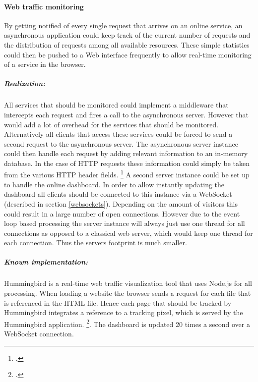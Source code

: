\paragraph{Web traffic monitoring} By getting notified of every single request that
arrives on an online service, an asynchronous application could keep track of the
current number of requests and the distribution of requests among all
available resources. These simple statistics could then be pushed to a Web interface
frequently to allow real-time monitoring of a service in the browser.
\subparagraph{Realization:} All services that should be monitored could implement a
middleware that intercepts each request and fires a call to the asynchronous
server. However that would add a lot of overhead for the services that should
be monitored. Alternatively all clients that access these services could be forced to send a
second request to the asynchronous server.
The asynchronous server instance could then handle each request by adding
relevant information to an in-memory database. In the case of HTTP requests
these information could simply be taken from the various HTTP header fields.
\footcite[Cf.][]{http_rfc}
A second server instance could be set up to handle the online dashboard.
In order to allow instantly updating the dashboard all clients should be
connected to this instance via a WebSocket (described in section \ref{websockets}). Depending on the amount of visitors
this could result in a large number of open connections. However due to the
event loop based processing the server instance will always just use one
thread for all connections as opposed to a classical web server, which would
keep one thread for each connection. Thus the servers footprint is much
smaller.
\subparagraph{Known implementation:} Hummingbird is a real-time web traffic
visualization tool that uses Node.js for all processing. When loading a
website the browser sends a request for each file that is referenced in the
HTML file. Hence each page that should be tracked by Hummingbird integrates a
reference to a tracking pixel, which is served by the Hummingbird application.
\footcite[Cf.][]{hummingbird}. The dashboard is updated 20 times a second
over a WebSocket connection.

